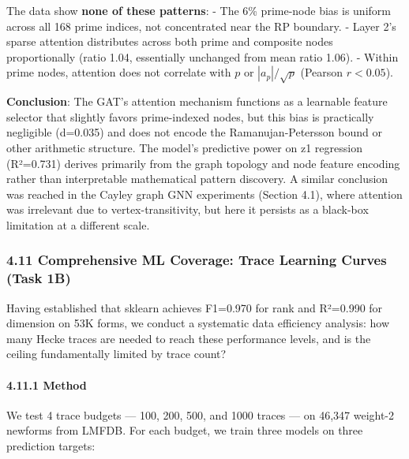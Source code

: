 \documentclass[
]{article}
\begin{document}
The data show \textbf{none of these patterns}: - The 6\% prime-node bias
is uniform across all 168 prime indices, not concentrated near the RP
boundary. - Layer 2's sparse attention distributes across both prime and
composite nodes proportionally (ratio 1.04, essentially unchanged from
mean ratio 1.06). - Within prime nodes, attention does not correlate
with \(p\) or \(|a_p|/\sqrt{p}\) (Pearson \(r < 0.05\)).

\textbf{Conclusion}: The GAT's attention mechanism functions as a
learnable feature selector that slightly favors prime-indexed nodes, but
this bias is practically negligible (d=0.035) and does not encode the
Ramanujan-Petersson bound or other arithmetic structure. The model's
predictive power on z1 regression (R²=0.731) derives primarily from the
graph topology and node feature encoding rather than interpretable
mathematical pattern discovery. A similar conclusion was reached in the
Cayley graph GNN experiments (Section 4.1), where attention was
irrelevant due to vertex-transitivity, but here it persists as a
black-box limitation at a different scale.

\hypertarget{comprehensive-ml-coverage-trace-learning-curves-task-1b}{%
\subsubsection{4.11 Comprehensive ML Coverage: Trace Learning Curves
(Task
1B)}\label{comprehensive-ml-coverage-trace-learning-curves-task-1b}}

Having established that sklearn achieves F1=0.970 for rank and R²=0.990
for dimension on 53K forms, we conduct a systematic data efficiency
analysis: how many Hecke traces are needed to reach these performance
levels, and is the ceiling fundamentally limited by trace count?

\hypertarget{method-1}{%
\paragraph{4.11.1 Method}\label{method-1}}

We test 4 trace budgets --- 100, 200, 500, and 1000 traces --- on 46,347
weight-2 newforms from LMFDB. For each budget, we train three models on
three prediction targets:
\end{document}
